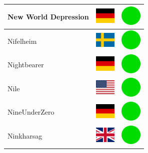 \documentclass[12pt, a4paper, twoside]{report}
\begin{document}
\begin{center}
\begin{longtable}{|p{5cm}|p{2cm}|p{2cm}|}
 New World Depression                                       & \includegraphics[width=1cm]{../img/flags/de} &   \includegraphics[width=1cm]{../likes/y} \\ \hline
 Nifelheim                                                  & \includegraphics[width=1cm]{../img/flags/se} &   \includegraphics[width=1cm]{../likes/y} \\ \hline
 Nightbearer                                                & \includegraphics[width=1cm]{../img/flags/de} &   \includegraphics[width=1cm]{../likes/y} \\ \hline
 Nile                                                       & \includegraphics[width=1cm]{../img/flags/us} &   \includegraphics[width=1cm]{../likes/y} \\ \hline
 NineUnderZero                                              & \includegraphics[width=1cm]{../img/flags/de} &   \includegraphics[width=1cm]{../likes/y} \\ \hline
 Ninkharsag                                                 & \includegraphics[width=1cm]{../img/flags/gb} &   \includegraphics[width=1cm]{../likes/y} \\ \hline

\end{longtable}
\end{center}
\end{document}
